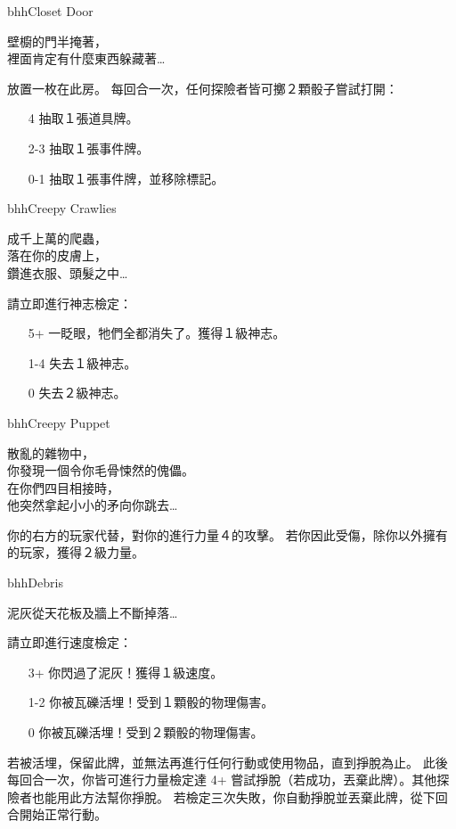 \linebreak[0]%
\begin{EventCard}{bhh}{Closet Door}
  \begin{CardStory}
    壁櫥的門半掩著，\\
    裡面肯定有什麼東西躲藏著…
  \end{CardStory}
  放置一枚在此房。\smallbreak
  每回合一次，任何探險者皆可擲２顆骰子嘗試打開：
  \begin{itemize}
    \item[4] 抽取１張道具牌。
    \item[2-3] 抽取１張事件牌。
    \item[0-1] 抽取１張事件牌，並移除標記。
  \end{itemize}
\end{EventCard}%
\linebreak[0]%
\begin{EventCard}{bhh}{Creepy Crawlies}
  \begin{CardStory}
    成千上萬的爬蟲，\\
    落在你的皮膚上，\\
    鑽進衣服、頭髮之中…
  \end{CardStory}
  請立即進行神志檢定：
  \begin{itemize}
    \item[5+] 一眨眼，牠們全都消失了。獲得１級神志。
    \item[1-4] 失去１級神志。
    \item[0] 失去２級神志。
  \end{itemize}
\end{EventCard}%
\linebreak[0]%
\begin{EventCard}{bhh}{Creepy Puppet}
  \begin{CardStory}
    散亂的雜物中，\\
    你發現一個令你毛骨悚然的傀儡。\\
    在你們四目相接時，\\
    他突然拿起小小的矛向你跳去…
  \end{CardStory}
  你的右方的玩家代替\ThisName{}，對你的進行力量４的攻擊。\smallbreak
  若你因此受傷，除你以外擁有的玩家，獲得２級力量。\smallbreak
\end{EventCard}%
\linebreak[0]%
\begin{EventCard}{bhh}{Debris}
  \begin{CardStory}
    泥灰從天花板及牆上不斷掉落…
  \end{CardStory}
  \footnotesize
  請立即進行速度檢定：
  \begin{itemize}
    \item[3+] 你閃過了泥灰！獲得１級速度。
    \item[1-2] 你被瓦礫活埋！受到１顆骰的物理傷害。
    \item[0] 你被瓦礫活埋！受到２顆骰的物理傷害。
  \end{itemize}
  若被活埋，保留此牌，並無法再進行任何行動或使用物品，直到掙脫為止。\smallbreak
  此後每回合一次，你皆可進行力量檢定達 4+ 嘗試掙脫（若成功，丟棄此牌）。其他探險者也能用此方法幫你掙脫。\smallbreak
  若檢定三次失敗，你自動掙脫並丟棄此牌，從下回合開始正常行動。\smallbreak
\end{EventCard}%
